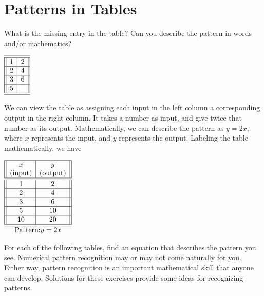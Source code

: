 \documentclass[nooutcomes]{ximera}
\begin{document}
\section{Patterns in Tables}
\begin{example}
What is the missing entry in the table? Can you describe the pattern in words and/or mathematics?

\begin{center}
$
\begin{array}{||c|c||}
\hline 
\hline
1&2\\
\hline
2&4\\
\hline
3&6\\
\hline
5& \\
\hline 
\hline
\end{array}
$
\end{center}



 \begin{explanation}
We can view the table as assigning each input in the left column a corresponding output in the right column. It takes a number as input, and give twice that number as its output. Mathematically, we can describe the pattern as $y=2x$, where $x$  represents the input, and $y$ represents the output. Labeling the table mathematically, we have

\begin{center}
$
\begin{array}{||c|c||}
\hline
x&y\\
\text{(input)}&\text{(output)}\\
\hline 
\hline
1&2\\
\hline
2&4\\
\hline
3&6\\
\hline
5&10\\
\hline
10&20\\
\hline 
\hline
\multicolumn{2}{c}{\text{Pattern:}y=2x}\\
\end{array}
$
\end{center}



\end{explanation}
\end{example}

For each of the following tables, find an equation that describes the pattern you see. Numerical pattern recognition may or may not come naturally for you. Either way, pattern recognition is an important mathematical skill that anyone can develop. Solutions for these exercises provide some ideas for recognizing patterns.
\end{document}
